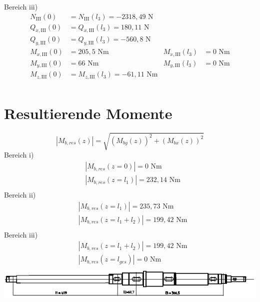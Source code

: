 Bereich iii)
\begin{align*}
	N_{\mathrm{III}} (0) &= N_{\mathrm{III}} (l_3) = -2318,49 \text{ N}\\
	Q_{x,\mathrm{III}} (0) &= Q_{x,\mathrm{III}} (l_3) = 180,11\text{ N}\\
	Q_{y,\mathrm{III}} (0) &= Q_{y,\mathrm{III}} (l_3) = -560,8\text{ N}\\
	M_{x,\mathrm{III}} (0) &= 205,5\text{ Nm} & M_{x,\mathrm{III}} (l_3) &= 0\text{ Nm}\\
	M_{y,\mathrm{III}} (0) &=  66\text{ Nm} & M_{y,\mathrm{III}} (l_3) &= 0\text{ Nm}\\
	M_{z,\mathrm{III}} (0) &= M_{z,\mathrm{III}} (l_3) = -61,11\text{ Nm}\\
\end{align*}
\newpage
\section{Resultierende Momente}
\[
	|M_{b,res}(z)| = \sqrt{\left( M_{by}(z) \right)^2 + \left( M_{bx}(z) \right)^2 }
\]
Bereich i)
\begin{align*}
	&|M_{b,res}(z=0)| = 0 \text{ Nm} \\
	&|M_{b,res}(z=l_1)| = 232,14 \text{ Nm} \\
\end{align*}
Bereich ii)
\begin{align*}
	&|M_{b,res}(z=l_1)| = 235,73 \text{ Nm} \\
	&|M_{b,res}(z=l_1+l_2)| = 199,42 \text{ Nm} \\
\end{align*}
Bereich iii)
\begin{align*}
	&|M_{b,res}(z=l_1+l_2)| = 199,42 \text{ Nm} \\
	&|M_{b,res}(z=l_{ges})| = 0 \text{ Nm} \\
\end{align*}
\includegraphics[width=\textwidth,keepaspectratio]{figures/Welle1klein.png}